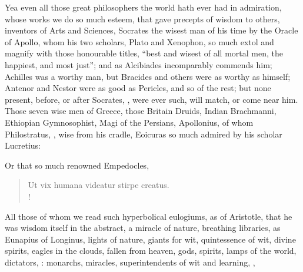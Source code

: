 Yea even all those great philosophers the world hath ever had in admiration,
whose works we do so much esteem, that gave precepts of wisdom to others,
inventors of Arts and Sciences, Socrates the wisest man of his time by the
Oracle of Apollo, whom his two scholars, Plato and
Xenophon, so much extol and magnify with those honourable
titles, \enquote{best and wisest of all mortal men, the happiest, and most just}; and
as Alcibiades incomparably commends him; Achilles was a
worthy man, but Bracides and others were as worthy as himself; Antenor and
Nestor were as good as Pericles, and so of the rest; but none present, before,
or after Socrates, , were ever such,
will match, or come near him. Those seven wise men of Greece, those Britain
Druids, Indian Brachmanni, Ethiopian Gymnosophist, Magi of the Persians,
Apollonius, of whom Philostratus, , wise from
his cradle, Eoicuras so much admired by his scholar Lucretius:


Or that so much renowned Empedocles,

\begin{latin}
\begin{verse}%
Ut vix humana videatur stirpe creatus.\\!
\end{verse}%
\end{latin}

All those of whom we read such hyperbolical eulogiums, as
of Aristotle, that he was wisdom itself in the abstract, a
miracle of nature, breathing libraries, as Eunapius of Longinus, lights of
nature, giants for wit, quintessence of wit, divine spirits, eagles in the
clouds, fallen from heaven, gods, spirits, lamps of the world, dictators,
: monarchs, miracles,
superintendents of wit and learning, ,

